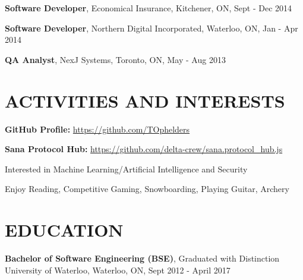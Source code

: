 \documentclass[letterpaper,11pt]{article}
\newcommand{\itemheader}[1]{\hspace*{7pt}\textbf{#1}}
\begin{document}
        \vspace{7pt}
      \itemheader{Software Developer}, Economical Insurance, Kitchener, ON, Sept - Dec 2014

        \vspace{3pt}
		\itemheader{Software Developer}, Northern Digital Incorporated, Waterloo, ON, Jan - Apr 2014
        
        \vspace{3pt}
		\itemheader{QA Analyst}, NexJ Systems, Toronto, ON, May - Aug 2013

	\section*{ACTIVITIES AND INTERESTS}
		\itemheader{GitHub Profile:} \url{https://github.com/TOphelders}
        
		\vspace*{1pt}
		\itemheader{Sana Protocol Hub:} \url{https://github.com/delta-crew/sana.protocol_hub.js}

        \vspace*{1pt}
        \hspace*{5pt} Interested in Machine Learning/Artificial Intelligence and Security
        
		\vspace*{1pt}
		\hspace*{7pt}Enjoy Reading, Competitive Gaming, Snowboarding, Playing Guitar, Archery
        
	\section*{EDUCATION}
		\itemheader{Bachelor of Software Engineering (BSE)}, Graduated with Distinction\\\hspace*{25pt}University of Waterloo, Waterloo, ON, Sept 2012 - April 2017
\end{document}
